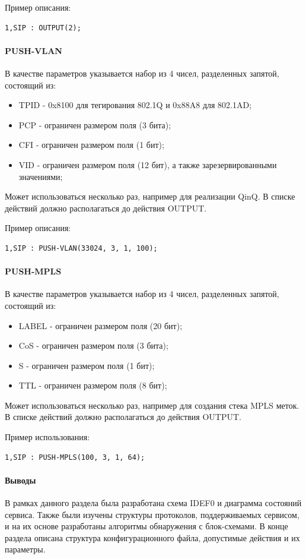 Пример описания:
\begin{lstlisting}
1,SIP : OUTPUT(2);
\end{lstlisting}

\paragraph{PUSH-VLAN}

В качестве параметров указывается набор из 4 чисел, разделенных запятой, состоящий из:
\begin{itemize}
\item TPID - 0x8100 для тегирования 802.1Q и 0x88A8 для 802.1AD;
\item PCP - ограничен размером поля (3 бита);
\item CFI - ограничен размером поля (1 бит);
\item VID - ограничен размером поля (12 бит), а также зарезервированными значениями;
\end{itemize}

Может использоваться несколько раз, например для реализации QinQ. В списке действий должно располагаться до действия OUTPUT.

Пример описания:
\begin{lstlisting}
1,SIP : PUSH-VLAN(33024, 3, 1, 100);
\end{lstlisting}

\paragraph{PUSH-MPLS}

В качестве параметров указывается набор из 4 чисел, разделенных запятой, состоящий из:
\begin{itemize}
\item LABEL - ограничен размером поля (20 бит);
\item CoS - ограничен размером поля (3 бита);
\item S - ограничен размером поля (1 бит);
\item TTL - ограничен размером поля (8 бит);
\end{itemize}

Может использоваться несколько раз, например для создания стека MPLS меток. В списке действий должно располагаться до действия OUTPUT.

Пример использования:
\begin{lstlisting}
1,SIP : PUSH-MPLS(100, 3, 1, 64);
\end{lstlisting}

\paragraph{Выводы}

В рамках данного раздела была разработана схема IDEF0 и диаграмма состояний сервиса. Также были изучены структуры протоколов, поддерживаемых сервисом, и на их основе разработаны алгоритмы обнаружения с блок-схемами. В конце раздела описана структура конфигурационного файла, допустимые действия и их параметры.
